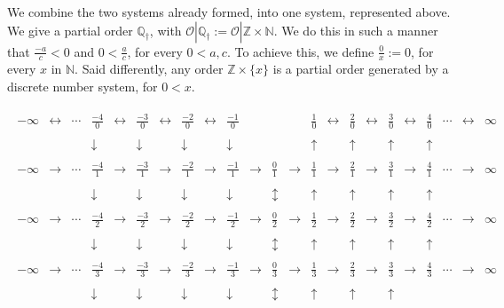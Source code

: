 \documentclass [12pt]{book}
\begin{document}
We combine the two systems already formed, into one system, represented above. We give a partial order $\mathbb Q_\dagger$, with $\mathcal O|\mathbb Q_\dagger:=\mathcal O|\mathbb Z\times\mathbb N$. We do this in such a manner that $\frac{-a}{c}<0$ and $0<\frac{a}{c}$, for every $0<a,c$. To achieve this, we define $\frac{0}{x}:=0$, for every $x$ in $\mathbb N$. Said differently, any order $\mathbb{Z}\times\{x\}$ is a partial order generated by a discrete number system, for $0<x$.

\begin{eqnarray}\begin{array}{rrrrrrrrrrrrrrrrrrrrrrrrrrrrrrrrrrrrrrrrrrrrrrrrrrrrrrrrrrrrrrrrrrrrrrrrrrrrrrrr}
-\infty&\leftrightarrow&\cdots & \frac{-4}{0}&\leftrightarrow& \frac{-3}{0}&\leftrightarrow& \frac{-2}{0}&\leftrightarrow& \frac{-1}{0}&&&& \frac{1}{0} &\leftrightarrow& \frac{2}{0}&\leftrightarrow& \frac{3}{0}&\leftrightarrow& \frac{4}{0} &\cdots&\leftrightarrow&\infty\\\\&&&\downarrow&& \downarrow&&\downarrow&& \downarrow&&&&\uparrow &&\uparrow&&\uparrow&&
\uparrow&&&\\\\-\infty&\rightarrow &\cdots & \frac{-4}{1}&\rightarrow & \frac{-3}{1}&\rightarrow  & \frac{-2}{1}&\rightarrow  & \frac{-1}{1}&\rightarrow  & \frac{0}{1}&\rightarrow   & \frac{1}{1} &\rightarrow & \frac{2}{1}&\rightarrow  & \frac{3}{1}&\rightarrow  & \frac{4}{1} &\cdots&\rightarrow&\infty\\\\ &&&\downarrow&& \downarrow&&\downarrow&& \downarrow&&\updownarrow&&\uparrow &&\uparrow&&\uparrow&&
\uparrow&&& \\\\-\infty&\rightarrow&\cdots & \frac{-4}{2}&\rightarrow & \frac{-3}{2}&\rightarrow  & \frac{-2}{2}&\rightarrow  & \frac{-1}{2}&\rightarrow  & \frac{0}{2}&\rightarrow   & \frac{1}{2} &\rightarrow & \frac{2}{2}&\rightarrow  & \frac{3}{2}&\rightarrow  & \frac{4}{2}&\cdots &\rightarrow&\infty\\\\ &&&\downarrow&& \downarrow&&\downarrow&& \downarrow&&\updownarrow&&\uparrow &&\uparrow&&\uparrow&&
\uparrow&&& \\\\-\infty&\rightarrow&\cdots & \frac{-4}{3}&\rightarrow & \frac{-3}{3}&\rightarrow  & \frac{-2}{3}&\rightarrow  & \frac{-1}{3}&\rightarrow  & \frac{0}{3}&\rightarrow   & \frac{1}{3} &\rightarrow & \frac{2}{3}&\rightarrow  & \frac{3}{3}&\rightarrow  & \frac{4}{3} &\cdots&\rightarrow &\infty\\\\&&&\downarrow&& \downarrow&&\downarrow&& \downarrow&&\updownarrow&&\uparrow &&\uparrow&&\uparrow&&

\end{array}
\end{eqnarray}
\end{document}
